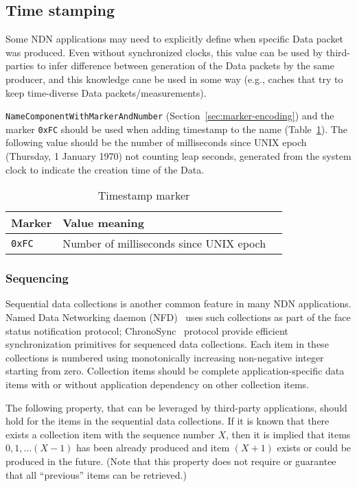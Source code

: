 \subsection{Time stamping}
\label{sec:timestamp}

Some NDN applications may need to explicitly define when specific Data packet was produced.
Even without synchronized clocks, this value can be used by third-parties to infer difference between generation of the Data packets by the same producer, and this knowledge cane be used in some way (e.g., caches that try to keep time-diverse Data packets/measurements).

\texttt{NameComponentWithMarkerAndNumber} (Section~\ref{sec:marker-encoding}) and the marker \verb|0xFC| should be used when adding timestamp to the name (Table~\ref{tab:timestamp}).
The following value should be the number of milliseconds since UNIX epoch (Thursday, 1 January 1970) not counting leap seconds, generated from the system clock to indicate the creation time of the Data.

\begin{table}[h!]
  \centering
  \caption{Timestamp marker}
  \label{tab:timestamp}
  \begin{tabular}{|l|l|l|}
    \hline
    Marker & Value meaning \\
    \hline \hline
    \verb|0xFC| & Number of milliseconds since UNIX epoch \\
    \hline
  \end{tabular}
\end{table}


\subsubsection{Sequencing}
\label{sec:sequencing}

Sequential data collections is another common feature in many NDN applications.
Named Data Networking daemon (NFD)~\cite{nfd} uses such collections as part of the face status notification protocol; ChronoSync~\cite{ChronoSync} protocol provide efficient synchronization primitives for sequenced data collections.
Each item in these collections is numbered using monotonically increasing non-negative integer starting from zero.
Collection items should be complete application-specific data items with or without application dependency on other collection items.

The following property, that can be leveraged by third-party applications, should hold for the items in the sequential data collections.
If it is known that there exists a collection item with the sequence number $X$, then it is implied that items $0, 1, \ldots (X-1)$ has been already produced and item $(X+1)$ exists or could be produced in the future.
(Note that this property does not require or guarantee that all ``previous'' items can be retrieved.)

